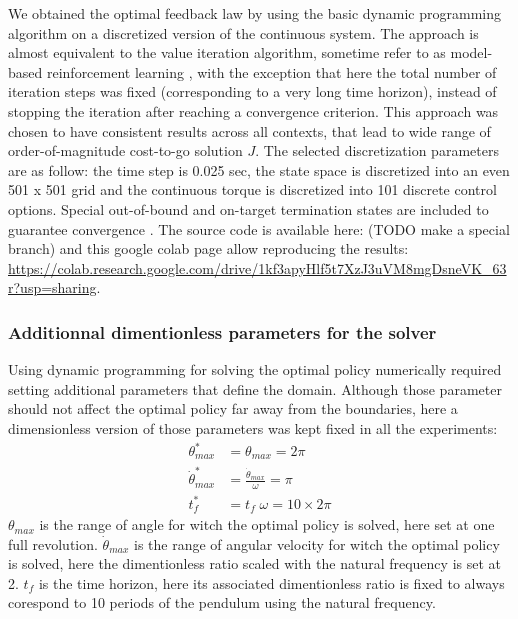 We obtained the optimal feedback law by using the basic dynamic programming algorithm \cite{bertsekas_dynamic_2012} on a discretized version of the continuous system. The approach is almost equivalent to the value iteration algorithm, sometime refer to as model-based reinforcement learning \cite{sutton_reinforcement_2018}, with the exception that here the total number of iteration steps was  fixed (corresponding to a very long time horizon), instead of stopping the iteration after reaching a convergence criterion. This approach was chosen to have consistent results across all contexts, that lead to wide range of order-of-magnitude cost-to-go solution $J$. The selected discretization parameters are as follow:
the time step is 0.025 sec, the state space is discretized into an even 501 x 501 grid and the continuous torque is discretized into 101 discrete control options. Special out-of-bound and on-target termination states are included to
guarantee convergence \cite{bertsekas_dynamic_2012}. The source code is available here: (TODO make a special branch) and this google colab page allow reproducing the results: \url{https://colab.research.google.com/drive/1kf3apyHlf5t7XzJ3uVM8mgDsneVK_63r?usp=sharing}.


\subsubsection{Additionnal dimentionless parameters for the solver}

Using dynamic programming for solving the optimal policy numerically required setting additional parameters that define the domain. Although those parameter should not affect the optimal policy far away from the boundaries, here a dimensionless version of those parameters was kept fixed in all the experiments:
\begin{align}
\theta^*_{max} &= \theta_{max} = 2 \pi \\
\dot{\theta}^*_{max} &= \frac{ \dot{\theta}_{max} }{\omega} = \pi \\
t^*_{f} &= t_{f} \; \omega = 10 \times 2 \pi 
\end{align}
$\theta_{max}$ is the range of angle for witch the optimal policy is solved, here set at one full revolution. $\dot{\theta}_{max}$ is the range of angular velocity for witch the optimal policy is solved, here the dimentionless ratio scaled with the natural frequency is set at 2. $t_{f}$ is the time horizon, here its associated dimentionless ratio is fixed to always corespond to 10 periods of the pendulum using the natural frequency.



